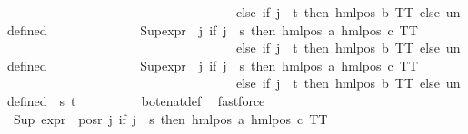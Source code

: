 \begin{isabellebody}
\ \ \ \ \ \ \ \ \ \ \ \ \ \ \ \ \ \ \ \ \ \ \ \ \ \ \ \ \ \ \ \ \ \ \ \ else\ if\ j\ {\isacharequal}{\kern0pt}\ t\ then\ hml{\isacharunderscore}{\kern0pt}pos\ b\ TT\ else\ undefined{\isacharparenright}{\kern0pt}\ {\isacharbackquote}{\kern0pt}\ {\isacharbraceleft}{\kern0pt}{\isacharbraceright}{\kern0pt}{\isacharparenright}{\kern0pt}{\isacharparenright}{\kern0pt}{\isacharparenright}{\kern0pt}\ {\isacharequal}{\kern0pt}\ {}{\isachardoublequoteclose}\isanewline
\ \ \ \ \ \ \ \ \ \ {\isachardoublequoteopen}Sup{\isacharparenleft}{\kern0pt}{\isacharparenleft}{\kern0pt}expr{\isacharunderscore}{\kern0pt}{}\ {\isasymcirc}\ {\isacharparenleft}{\kern0pt}{\isasymlambda}j{\isachardot}{\kern0pt}\ if\ j\ {\isacharequal}{\kern0pt}\ s\ then\ hml{\isacharunderscore}{\kern0pt}pos\ a\ {\isacharparenleft}{\kern0pt}hml{\isacharunderscore}{\kern0pt}pos\ c\ TT{\isacharparenright}{\kern0pt}\isanewline
\ \ \ \ \ \ \ \ \ \ \ \ \ \ \ \ \ \ \ \ \ \ \ \ \ \ \ \ \ \ \ \ \ \ \ \ else\ if\ j\ {\isacharequal}{\kern0pt}\ t\ then\ hml{\isacharunderscore}{\kern0pt}pos\ b\ TT\ else\ undefined{\isacharparenright}{\kern0pt}{\isacharparenright}{\kern0pt}\ {\isacharbackquote}{\kern0pt}\ {\isacharbraceleft}{\kern0pt}{\isacharbraceright}{\kern0pt}{\isacharparenright}{\kern0pt}\ {\isacharequal}{\kern0pt}\ {}{\isachardoublequoteclose}\isanewline
\ \ \ \ \ \ \ \ \ \ {\isachardoublequoteopen}Sup{\isacharparenleft}{\kern0pt}{\isacharparenleft}{\kern0pt}expr{\isacharunderscore}{\kern0pt}{}\ {\isasymcirc}\ {\isacharparenleft}{\kern0pt}{\isasymlambda}j{\isachardot}{\kern0pt}\ if\ j\ {\isacharequal}{\kern0pt}\ s\ then\ hml{\isacharunderscore}{\kern0pt}pos\ a\ {\isacharparenleft}{\kern0pt}hml{\isacharunderscore}{\kern0pt}pos\ c\ TT{\isacharparenright}{\kern0pt}\isanewline
\ \ \ \ \ \ \ \ \ \ \ \ \ \ \ \ \ \ \ \ \ \ \ \ \ \ \ \ \ \ \ \ \ \ \ \ else\ if\ j\ {\isacharequal}{\kern0pt}\ t\ then\ hml{\isacharunderscore}{\kern0pt}pos\ b\ TT\ else\ undefined{\isacharparenright}{\kern0pt}{\isacharparenright}{\kern0pt}\ {\isacharbackquote}{\kern0pt}\ {\isacharbraceleft}{\kern0pt}s{\isacharcomma}{\kern0pt}\ t{\isacharbraceright}{\kern0pt}{\isacharparenright}{\kern0pt}\ {\isacharequal}{\kern0pt}\ {}{\isachardoublequoteclose}\isanewline
\ \ \ \ \ \ \isamarkupfalse%
\ bot{\isacharunderscore}{\kern0pt}enat{\isacharunderscore}{\kern0pt}def\ \isamarkupfalse%
\ fastforce{\isacharplus}{\kern0pt}\isanewline
\ \ \ \ \isamarkupfalse%
\ {\isachardoublequoteopen}Sup\ {\isacharparenleft}{\kern0pt}{\isacharparenleft}{\kern0pt}expr{\isacharunderscore}{\kern0pt}{}\ {\isacharbackquote}{\kern0pt}\ {\isacharparenleft}{\kern0pt}pos{\isacharunderscore}{\kern0pt}r\ {\isacharparenleft}{\kern0pt}{\isacharparenleft}{\kern0pt}{\isasymlambda}j{\isachardot}{\kern0pt}\ if\ j\ {\isacharequal}{\kern0pt}\ s\ then\ hml{\isacharunderscore}{\kern0pt}pos\ a\ {\isacharparenleft}{\kern0pt}hml{\isacharunderscore}{\kern0pt}pos\ c\ TT{\isacharparenright}{\kern0pt}\isanewline

\end{isabellebody}
